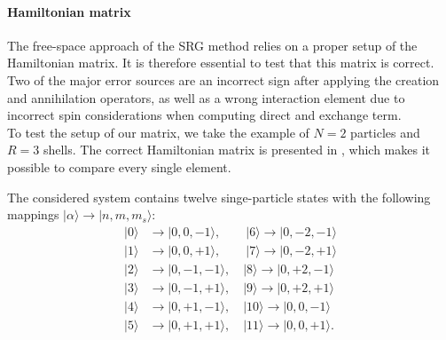 \paragraph*{Hamiltonian matrix} 
The free-space approach of the SRG method relies on a proper setup of the Hamiltonian matrix. It is therefore essential to test that this matrix is correct. Two of the major error sources are an incorrect sign after applying the creation and annihilation operators, as well as a wrong interaction element due to incorrect spin considerations when computing direct and exchange term.\\
To test the setup of our matrix, we take the example of $N = 2$ particles and $R = 3$ shells. The correct Hamiltonian matrix is presented in \cite{Marte}, which makes it possible to compare every single element.

The considered system contains twelve singe-particle states with the following mappings \mbox{$|\alpha\rangle \rightarrow |n,m,m_s\rangle$}:
\begin{align*}
|0\rangle &\rightarrow |0,0,-1\rangle, \quad\quad |6\rangle \rightarrow |0,-2,-1\rangle \\
|1\rangle &\rightarrow |0,0,+1\rangle, \quad\quad |7\rangle \rightarrow |0,-2,+1\rangle \\
|2\rangle &\rightarrow |0,-1,-1\rangle, \quad |8\rangle \rightarrow |0,+2,-1\rangle \\
|3\rangle &\rightarrow |0,-1,+1\rangle, \quad |9\rangle \rightarrow |0,+2,+1\rangle \\
|4\rangle &\rightarrow |0,+1,-1\rangle, \quad |10\rangle \rightarrow |0,0,-1\rangle \\
|5\rangle &\rightarrow |0,+1,+1\rangle, \quad |11\rangle \rightarrow |0,0,+1\rangle .\\
\end{align*}


